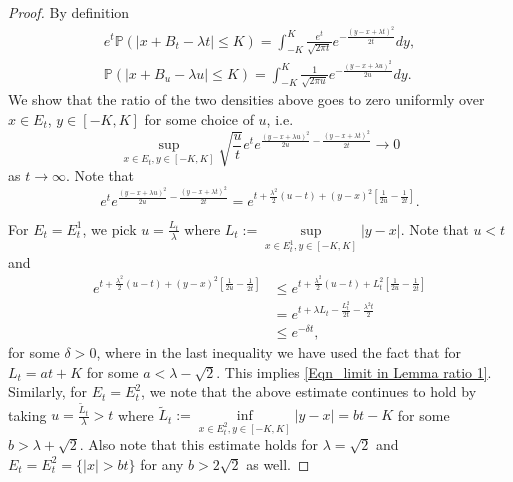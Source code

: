 \documentclass[a4paper,reqno]{amsart}%
\newcommand{\1}{\mathbf 1}
\theoremstyle{mine}
\numberwithin{theorem}{section}
\numberwithin{equation}{section}
\theoremstyle{remark}
\begin{document}
\begin{proof}
    By definition
    \begin{equation*}
        \begin{aligned}
            e^t \mathbb P(|x+B_t-\lambda t|\le K)=\int_{-K}^K \frac{e^t}{\sqrt{2\pi t}} e^{-\frac{(y-x+\lambda t)^2}{2t}}dy, \\
            \mathbb P(|x+B_u-\lambda u|\le K)=\int_{-K}^K \frac{1}{\sqrt{2\pi u}} e^{-\frac{(y-x+\lambda u)^2}{2u}}dy.
        \end{aligned}
    \end{equation*}
    We show that the ratio of the two densities above goes to zero uniformly over $x\in E_t$, $y\in[-K, K]$ for some choice of $u$, i.e.
    \begin{equation} \label{Eqn_limit in Lemma ratio 1}
        \sup_{x \in E_t, y\in [-K,K]} \sqrt{\frac{u}{t}} e^t e^{\frac{(y-x+\lambda u)^2}{2u}-\frac{(y-x+\lambda t)^2}{2t}} \longrightarrow 0
    \end{equation}
    as $t \to \infty.$
    Note that
    \begin{equation*}
        e^t e^{\frac{(y-x+\lambda u)^2}{2u}-\frac{(y-x+\lambda t)^2}{2t}}=e^{t+\frac{\lambda^2}{2}(u-t)+(y-x)^2\left[\frac{1}{2u}-\frac{1}{2t}\right]}.
    \end{equation*}

    For $E_t=E_t^1$, we pick $u=\frac{L_t}{\lambda}$ where $L_t:=\sup\limits_{x \in E_t^1, y \in [-K,K]} |y-x|$. Note that $u<t$ and 
    \begin{equation*}
        \begin{aligned}
            e^{t+\frac{\lambda^2}{2}(u-t)+(y-x)^2\left[\frac{1}{2u}-\frac{1}{2t}\right]} &\le e^{t+\frac{\lambda^2}{2}(u-t)+L_t^2 \left[\frac{1}{2u}-\frac{1}{2t}\right]} \\
            &= e^{t+\lambda L_t-\frac{L_t^2}{2t}-\frac{\lambda^2 t}{2}} \\
            &\leq e^{-\delta t},
        \end{aligned}
    \end{equation*}
   for some $\delta >0$, where in the last inequality we have used the fact that for $L_t = at +K $ for some $a <\lambda -\sqrt{2}$. This implies \eqref{Eqn_limit in Lemma ratio 1}. Similarly, for $E_t=E_t^{2}$, we note that the above estimate continues to hold by taking $u=\frac{\widetilde{L}_t}{\lambda} >t $ where ${\widetilde L}_t:=\inf\limits_{x \in E_t^2, y \in [-K,K]} |y-x| = bt-K $ for some $b>\lambda + \sqrt{2}$. Also note that this estimate holds for $\lambda = \sqrt{2}$ and $E_t = E_t^2 = \{|x| >bt\}$ for any $b>2\sqrt{2}$ as well.   
\end{proof}
\end{document}
